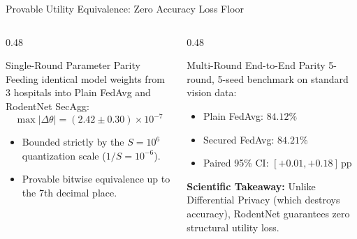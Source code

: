 \documentclass[aspectratio=169,10pt]{beamer}
\begin{document}
\begin{frame}{Provable Utility Equivalence: Zero Accuracy Loss Floor}
  \begin{columns}[T]
    \begin{column}{0.48\textwidth}
      \begin{block}{Single-Round Parameter Parity}
        Feeding identical model weights from 3 hospitals into Plain FedAvg and RodentNet SecAgg:
        \begin{equation*}
          \max |\Delta\theta| = (2.42 \pm 0.30) \times 10^{-7}
        \end{equation*}
        \begin{itemize}[itemsep=2pt]
          \item Bounded strictly by the $S = 10^6$ quantization scale ($1/S = 10^{-6}$).
          \item Provable bitwise equivalence up to the 7th decimal place.
        \end{itemize}
      \end{block}
    \end{column}
    \begin{column}{0.48\textwidth}
      \begin{block}{Multi-Round End-to-End Parity}
        5-round, 5-seed benchmark on standard vision data:
        \begin{itemize}[itemsep=2pt]
          \item Plain FedAvg: $84.12\%$
          \item Secured FedAvg: $84.21\%$
          \item Paired 95\% CI: $[+0.01, +0.18]$\,pp
        \end{itemize}
        \textbf{Scientific Takeaway:} Unlike Differential Privacy (which destroys accuracy), RodentNet guarantees zero structural utility loss.
      \end{block}
    \end{column}
  \end{columns}
\end{frame}
\end{document}
